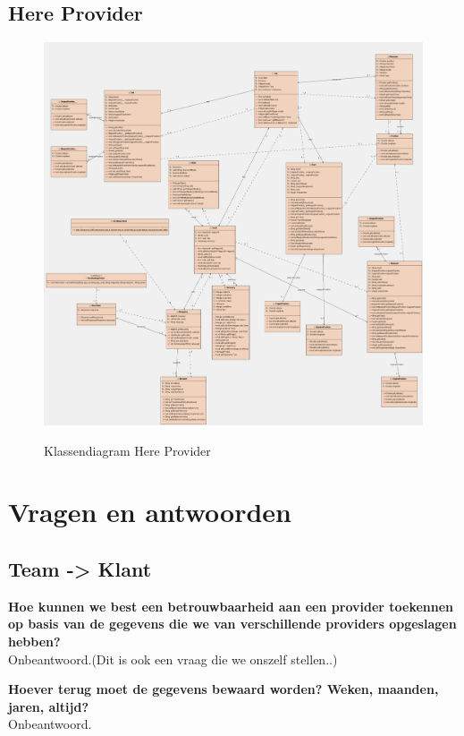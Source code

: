\documentclass[a4paper]{article}
\begin{document}
\subsection{Here Provider}

\begin{figure}[H]
\centering
\includegraphics[width=\textwidth]{Images/ktestproviderherer.png}\\
\caption{Klassendiagram Here Provider}
\end{figure}

\newpage

\section{Vragen en antwoorden}

\subsection{Team -> Klant}

\textbf{Hoe kunnen we best een betrouwbaarheid aan een provider toekennen op basis van de gegevens die we van verschillende providers opgeslagen hebben?}\\
Onbeantwoord.(Dit is ook een vraag die we onszelf stellen..)

\textbf{Hoever terug moet de gegevens bewaard worden? Weken, maanden, jaren, altijd?}\\
Onbeantwoord.
\end{document}
